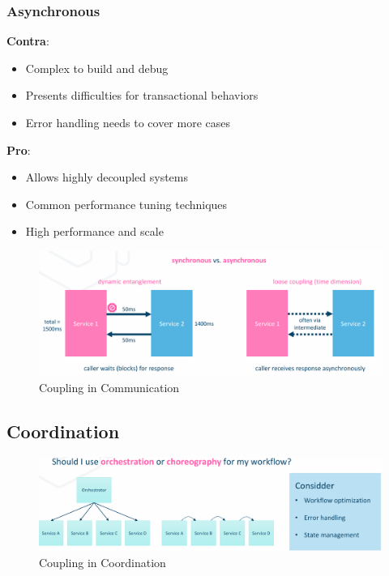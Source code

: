 \documentclass[../Main.tex]{subfiles}
\begin{document}
\subsubsection{Asynchronous}
\begin{multicols}{2}
    \textbf{Contra}:
    \begin{itemize}
        \item Complex to build and debug
        \item Presents difficulties for transactional behaviors
        \item Error handling needs to cover more cases
    \end{itemize}
    \textbf{Pro}:
    \begin{itemize}
        \item Allows highly decoupled systems
        \item Common performance tuning techniques
        \item High performance and scale
    \end{itemize}
\end{multicols}
\newpage

\begin{figure}[H]
    \centering
    \includegraphics[width=1\linewidth]{Images/coupling-comm.png}
    \caption{Coupling in Communication}
\end{figure}

\subsection{Coordination}
\begin{figure}[H]
    \centering
    \includegraphics[width=1\linewidth]{Images/coupling-coord.png}
    \caption{Coupling in Coordination}
\end{figure}
\end{document}
